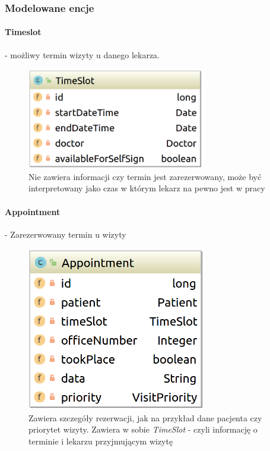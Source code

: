 \documentclass[polish,12pt]{aghthesis}
\begin{document}
\subsubsection{Modelowane encje}
    \paragraph{Timeslot} - możliwy termin wizyty u danego lekarza.
    \begin{figure}[H]
    \includegraphics[width=0.7\textwidth]{TimeSlot}
    \caption{Nie zawiera informacji czy termin jest zarezerwowany, może być interpretowany jako czas w którym lekarz na pewno jest w pracy}
    \end{figure}
    \paragraph{Appointment} - Zarezerwowany termin u wizyty
    \begin{figure}[H]
    \includegraphics[width=0.7\textwidth]{Appointment}
    \caption{Zawiera szczegóły rezerwacji, jak na przykład dane pacjenta czy priorytet wizyty.
    Zawiera w sobie \emph{TimeSlot} - czyli informację o terminie i lekarzu przyjmującym wizytę}
    \end{figure}
\end{document}
